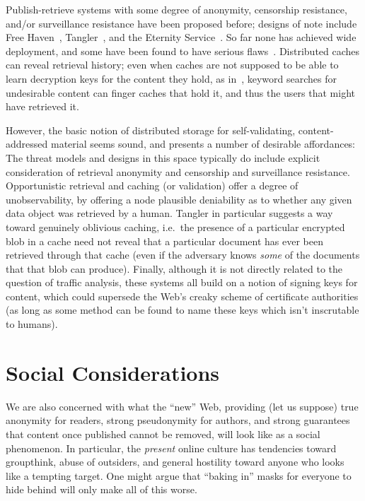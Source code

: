 \documentclass{zarticle}
\begin{document}
Publish-retrieve systems with some degree of anonymity, censorship
resistance, and/or surveillance resistance have been proposed before;
designs of note include Free Haven~\cite{dingledine2000freehaven},
Tangler~\cite{waldman2001tangler}, and the Eternity
Service~\cite{anderson1996eternity, benes2001strongeternity}. So far
none has achieved wide deployment, and some have been found to have
serious flaws~\cite{kugler2003gnunet}.  Distributed caches can reveal
retrieval history; even when caches are not supposed to be able to
learn decryption keys for the content they hold, as
in~\textcite{serjantov2002anonymizing}, keyword searches for
undesirable content can finger caches that hold it, and thus the users
that might have retrieved it.

However, the basic notion of distributed storage for self-validating,
content-addressed material seems sound, and presents a number of
desirable affordances: The threat models and designs in this space
typically do include explicit consideration of retrieval anonymity and
censorship and surveillance resistance.  Opportunistic retrieval and
caching (or validation) offer a degree of unobservability, by offering
a node plausible deniability as to whether any given data object was
retrieved by a human.  Tangler in particular suggests a way toward
genuinely oblivious caching, i.e.\ the presence of a particular
encrypted blob in a cache need not reveal that a particular document
has ever been retrieved through that cache (even if the adversary
knows \emph{some} of the documents that that blob can produce).
Finally, although it is not directly related to the question of
traffic analysis, these systems all build on a notion of signing keys
for content, which could supersede the Web's creaky scheme of
certificate authorities (as long as some method can be found to
name these keys which isn't inscrutable to humans).

\section{Social Considerations}

We are also concerned with what the “new” Web, providing (let us
suppose) true anonymity for readers, strong pseudonymity for authors,
and strong guarantees that content once published cannot be removed,
will look like as a social phenomenon.  In particular, the
\emph{present} online culture has tendencies toward groupthink, abuse
of outsiders, and general hostility toward anyone who looks like a
tempting target. One might argue that “baking in” masks for everyone
to hide behind will only make all of this worse.
\end{document}
